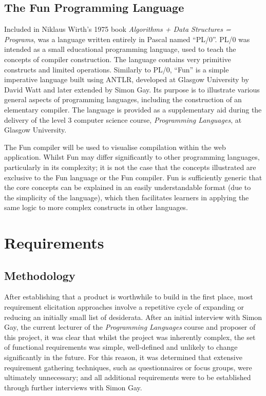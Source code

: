 \documentclass{l4proj}
\begin{document}
\section{The Fun Programming Language}
Included in Niklaus Wirth's 1975 book {\it Algorithms + Data Structures = Programs}, was a language written entirely in Pascal named ``PL/0''. PL/0 was intended as a small educational programming language, used to teach the concepts of compiler construction. The language contains very primitive constructs and limited operations. Similarly to PL/0, ``Fun'' is a simple imperative language built using ANTLR, developed at Glasgow University by David Watt and later extended by Simon Gay. Its purpose is to illustrate various general aspects of programming languages, including the construction of an elementary compiler. The language is provided as a supplementary aid during the delivery of the level 3 computer science course, {\it Programming Languages}, at Glasgow University.

The Fun compiler will be used to visualise compilation within the web application. Whilst Fun may differ significantly to other programming languages, particularly in its complexity; it is not the case that the concepts illustrated are exclusive to the Fun language or the Fun compiler. Fun is sufficiently generic that the core concepts can be explained in an easily understandable format (due to the simplicity of the language), which then facilitates learners in applying the same logic to more complex constructs in other languages.

\chapter{Requirements}
\section{Methodology} 
After establishing that a product is worthwhile to build in the first place, most requirement elicitation approaches involve a repetitive cycle of expanding or reducing an initially small list of desiderata. After an initial interview with Simon Gay, the current lecturer of the {\it Programming Languages} course and proposer of this project, it was clear that whilst the project was inherently complex, the set of functional requirements was simple, well-defined and unlikely to change significantly in the future. For this reason, it was determined that extensive requirement gathering techniques, such as questionnaires or focus groups, were ultimately unnecessary; and all additional requirements were to be established through further interviews with Simon Gay.
\end{document}
